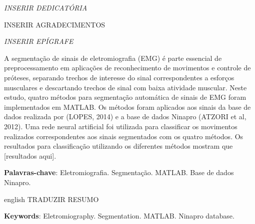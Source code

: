\documentclass[
	12pt,				%
	openright,			%
	oneside,
	a4paper,			%
	english,			%
	francais,			%
	spanish,			%
	brazil				%
	]{abntex2}
\begin{document}
\begin{dedicatoria}
   \vspace*{\fill}
   \centering
   \noindent
   \textit{ INSERIR DEDICATÓRIA } \vspace*{\fill}
\end{dedicatoria}

\begin{agradecimentos}
	INSERIR AGRADECIMENTOS
\end{agradecimentos}

\begin{epigrafe}
    \vspace*{\fill}
	\begin{flushright}
		\textit{ INSERIR EPÍGRAFE }
	\end{flushright}
\end{epigrafe}


\setlength{\absparsep}{18pt} %
\begin{resumo}
 A segmentação de sinais de eletromiografia (EMG) é parte essencial de preprocessamento em aplicações de reconhecimento de movimentos e controle de próteses, separando trechos de interesse do sinal correspondentes a esforços musculares e descartando trechos de sinal com baixa atividade muscular.
 Neste estudo, quatro métodos para segmentação automática de sinais de EMG foram implementados em MATLAB.
 Os métodos foram aplicados aos sinais da base de dados realizada por (LOPES, 2014) e a base de dados Ninapro (ATZORI et al, 2012).
 Uma rede neural artificial foi utilizada para classificar os movimentos realizados correspondentes aos sinais segmentados com os quatro métodos.
 Os resultados para classificação utilizando os diferentes métodos mostram que [resultados aqui]. 

 \textbf{Palavras-chave}: Eletromiografia. Segmentação. MATLAB. Base de dados Ninapro.
\end{resumo}

\begin{resumo}[Abstract]
 \begin{otherlanguage*}{english}
	TRADUZIR RESUMO
	
   \vspace{\onelineskip}
   \noindent 
   \textbf{Keywords}: Eletromiography. Segmentation. MATLAB. Ninapro database.
 \end{otherlanguage*}
\end{resumo}
\end{document}
